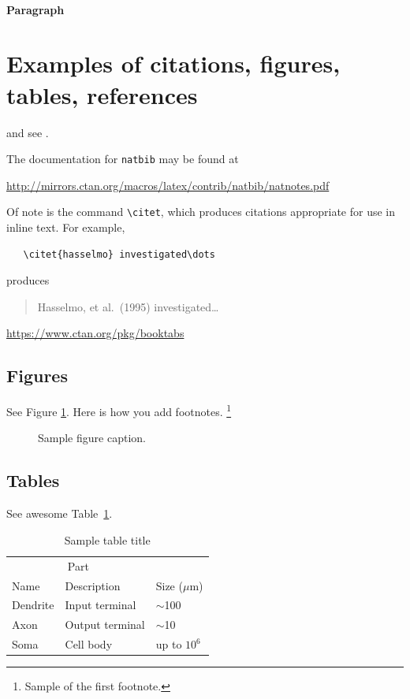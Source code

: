 \documentclass{article}
\begin{document}
\paragraph{Paragraph}
\lipsum[7]

\section{Examples of citations, figures, tables, references}
\label{sec:others}
\lipsum[8] \cite{kour2014real,kour2014fast} and see \cite{hadash2018estimate}.

The documentation for \verb+natbib+ may be found at
\begin{center}
  \url{http://mirrors.ctan.org/macros/latex/contrib/natbib/natnotes.pdf}
\end{center}
Of note is the command \verb+\citet+, which produces citations
appropriate for use in inline text.  For example,
\begin{verbatim}
   \citet{hasselmo} investigated\dots
\end{verbatim}
produces
\begin{quote}
  Hasselmo, et al.\ (1995) investigated\dots
\end{quote}

\begin{center}
  \url{https://www.ctan.org/pkg/booktabs}
\end{center}


\subsection{Figures}
\lipsum[10] 
See Figure \ref{fig:fig1}. Here is how you add footnotes. \footnote{Sample of the first footnote.}
\lipsum[11] 

\begin{figure}
  \centering
  \fbox{\rule[-.5cm]{4cm}{4cm} \rule[-.5cm]{4cm}{0cm}}
  \caption{Sample figure caption.}
  \label{fig:fig1}
\end{figure}

\subsection{Tables}
\lipsum[12]
See awesome Table~\ref{tab:table}.

\begin{table}
 \caption{Sample table title}
  \centering
  \begin{tabular}{lll}
    \toprule
    \multicolumn{2}{c}{Part}                   \\
    \cmidrule(r){1-2}
    Name     & Description     & Size ($\mu$m) \\
    \midrule
    Dendrite & Input terminal  & $\sim$100     \\
    Axon     & Output terminal & $\sim$10      \\
    Soma     & Cell body       & up to $10^6$  \\
    \bottomrule
  \end{tabular}
  \label{tab:table}
\end{table}
\end{document}
